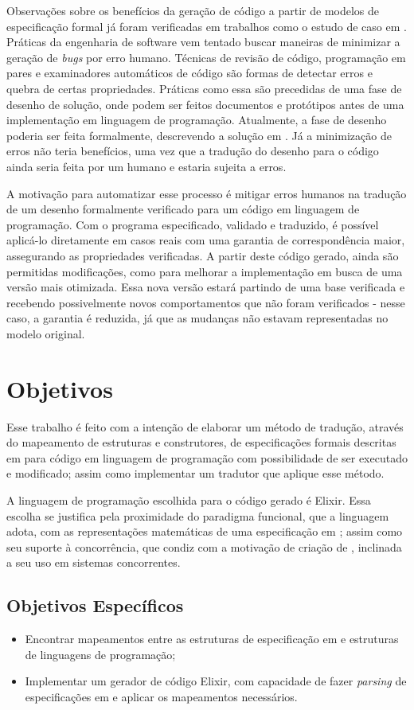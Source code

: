 Observações sobre os benefícios da geração de código a partir de modelos de especificação formal já foram verificadas em trabalhos como o estudo de caso em \cite{Leonard2008}. Práticas da engenharia de software vem tentado buscar maneiras de minimizar a geração de \textit{bugs} por erro humano. Técnicas de revisão de código, programação em pares e examinadores automáticos de código são formas de detectar erros e quebra de certas propriedades. Práticas como essa são precedidas de uma fase de desenho de solução, onde podem ser feitos documentos e protótipos antes de uma implementação em linguagem de programação. Atualmente, a fase de desenho poderia ser feita formalmente, descrevendo a solução em \TLAA. Já a minimização de erros não teria benefícios, uma vez que a tradução do desenho para o código ainda seria feita por um humano e estaria sujeita a erros.

A motivação para automatizar esse processo é mitigar erros humanos na tra\-du\-ção de um desenho formalmente verificado para um código em linguagem de programação. Com o programa especificado, validado e traduzido, é possível aplicá-lo diretamente em casos reais com uma garantia de correspondência maior, assegurando as propriedades verificadas. A partir deste código gerado, ainda são permitidas modificações, como para melhorar a implementação em busca de uma versão mais otimizada. Essa nova versão estará partindo de uma base verificada e recebendo possivelmente novos comportamentos que não foram verificados - nesse caso, a garantia é reduzida, já que as mudanças não estavam representadas no modelo original.

\section{Objetivos}

Esse trabalho é feito com a intenção de elaborar um método de tradução, através do mapeamento de estruturas e construtores, de especificações formais descritas em \TLA para código em linguagem de programação com possibilidade de ser executado e modificado; assim como implementar um tradutor que aplique esse método.

A linguagem de programação escolhida para o código gerado é Elixir. Essa escolha se justifica pela proximidade do paradigma funcional, que a linguagem adota, com as representações matemáticas de uma especificação em \TLAA; assim como seu suporte à concorrência, que condiz com a motivação de criação de \TLAA, inclinada a seu uso em sistemas concorrentes.

\subsection{Objetivos Específicos}
\begin{itemize}
  \item Encontrar mapeamentos entre as estruturas de especificação em \TLA e estruturas de linguagens de programação;
  \item Implementar um gerador de código Elixir, com capacidade de fazer \textit{parsing} de especificações em \TLA e aplicar os mapeamentos necessários.
\end{itemize}
